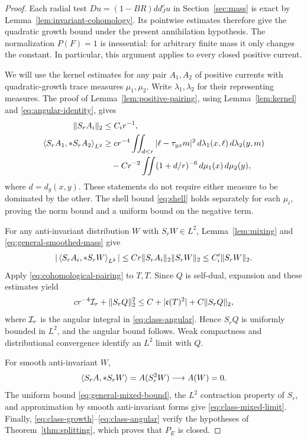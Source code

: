 \begin{proof}
Each radial test \(Du=(1-BR)dd_J^cu\) in
Section~\ref{sec:mass} is exact by
Lemma~\ref{lem:invariant-cohomology}. Its pointwise estimates
therefore give the quadratic growth bound under the present
annihilation hypothesis. The normalization \(P(F)=1\) is inessential:
for arbitrary finite mass it only changes the constant. In particular,
this argument applies to every closed positive current.

We will use the kernel estimates for any pair \(A_1,A_2\) of positive
currents with quadratic-growth trace measures \(\mu_1,\mu_2\).
Write \(\lambda_1,\lambda_2\) for their representing measures.
The proof of Lemma~\ref{lem:positive-pairing}, using
Lemma~\ref{lem:kernel} and \eqref{eq:angular-identity}, gives
\begin{align}
 \|S_rA_i\|_2&\le C_i r^{-1},\label{eq:general-smoothed-mass}\\
 \left\langle S_rA_1,*S_rA_2\right\rangle_{L^2}
 &\ge cr^{-4}\iint_{d<r}|\ell-\tau_{yx}m|^2
            \,d\lambda_1(x,\ell)\,d\lambda_2(y,m)
 \nonumber\\
 &\quad-Cr^{-2}\iint(1+d/r)^{-6}
                     \,d\mu_1(x)\,d\mu_2(y),
 \label{eq:general-positive-pairing}
\end{align}
where \(d=d_g(x,y)\). These statements do not require either measure
to be dominated by the other. The shell bound
\eqref{eq:shell} holds separately for each \(\mu_i\), proving
the norm bound and a uniform bound on the negative term.

For any anti-invariant distribution \(W\) with \(S_rW\in L^2\),
Lemma~\ref{lem:mixing} and \eqref{eq:general-smoothed-mass} give
\begin{equation}\label{eq:general-mixed-bound}
 |\left\langle S_rA_i,*S_rW\right\rangle_{L^2}|
 \le Cr\|S_rA_i\|_2\|S_rW\|_2
 \le C_i'\|S_rW\|_2.
\end{equation}
Apply \eqref{eq:cohomological-pairing} to \(T,T\).
Since \(Q\) is self-dual, expansion and these estimates yield
\[
 cr^{-4}\mathcal I_r+\|S_rQ\|_2^2
 \le C+|\mathfrak c(T)^2|+C\|S_rQ\|_2,
\]
where \(\mathcal I_r\) is the angular integral in
\eqref{eq:class-angular}. Hence \(S_rQ\) is uniformly bounded
in \(L^2\), and the angular bound follows. Weak compactness and
distributional convergence identify an \(L^2\) limit with \(Q\).

For smooth anti-invariant \(W\),
\[
 \left\langle S_rA,*S_rW\right\rangle=A(S_r^2W)\longrightarrow A(W)=0.
\]
The uniform bound \eqref{eq:general-mixed-bound}, the \(L^2\)
contraction property of \(S_r\), and approximation by smooth
anti-invariant forms give \eqref{eq:class-mixed-limit}.
Finally, \eqref{eq:class-growth}--\eqref{eq:class-angular} verify
the hypotheses of Theorem~\ref{thm:splitting}, which proves that
\(P_E\) is closed.
\end{proof}

